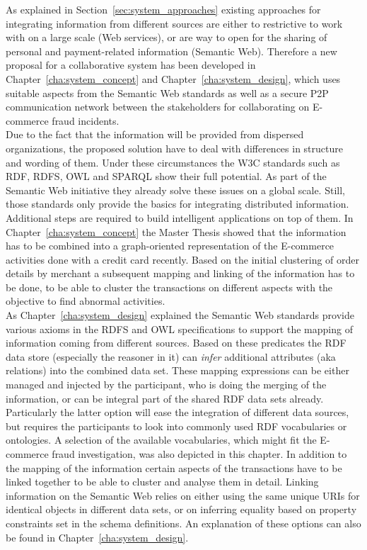 As explained in Section~\ref{sec:system_approaches} existing approaches for integrating information from different sources are either to restrictive to work with on a large scale (Web services), or are way to open for the sharing of personal and payment-related information (Semantic Web). Therefore a new proposal for a collaborative system has been developed in Chapter~\ref{cha:system_concept} and Chapter~\ref{cha:system_design}, which uses suitable aspects from the Semantic Web standards as well as a secure \gls{P2P} communication network between the stakeholders for collaborating on \gls{E-commerce} fraud incidents. \\

Due to the fact that the information will be provided from dispersed organizations, the proposed solution have to deal with differences in structure and wording of them. Under these circumstances the \gls{W3C} standards such as \gls{RDF}, \gls{RDFS}, \gls{OWL} and \gls{SPARQL} show their full potential. As part of the Semantic Web initiative they already solve these issues on a global scale. Still, those standards only provide the basics for integrating distributed information. Additional steps are required to build intelligent applications on top of them. In Chapter~\ref{cha:system_concept} the Master Thesis showed that the information has to be combined into a graph-oriented representation of the \gls{E-commerce} activities done with a credit card recently. Based on the initial clustering of order details by merchant a subsequent mapping and linking of the information has to be done, to be able to cluster the transactions on different aspects with the objective to find abnormal activities. \\

As Chapter~\ref{cha:system_design} explained the Semantic Web standards provide various axioms in the \gls{RDFS} and \gls{OWL} specifications to support the mapping of information coming from different sources. Based on these predicates the \gls{RDF} data store (especially the reasoner in it) can \emph{infer} additional attributes (aka relations) into the combined data set. These mapping expressions can be either managed and injected by the participant, who is doing the merging of the information, or can be integral part of the shared \gls{RDF} data sets already. Particularly the latter option will ease the integration of different data sources, but requires the participants to look into commonly used \gls{RDF} vocabularies or ontologies. A selection of the available vocabularies, which might fit the \gls{E-commerce} fraud investigation, was also depicted in this chapter. In addition to the mapping of the information certain aspects of the transactions have to be linked together to be able to cluster and analyse them in detail. Linking information on the Semantic Web relies on either using the same unique \gls{URI}s for identical objects in different data sets, or on inferring equality based on property constraints set in the schema definitions. An explanation of these options can also be found in Chapter~\ref{cha:system_design}. \\

